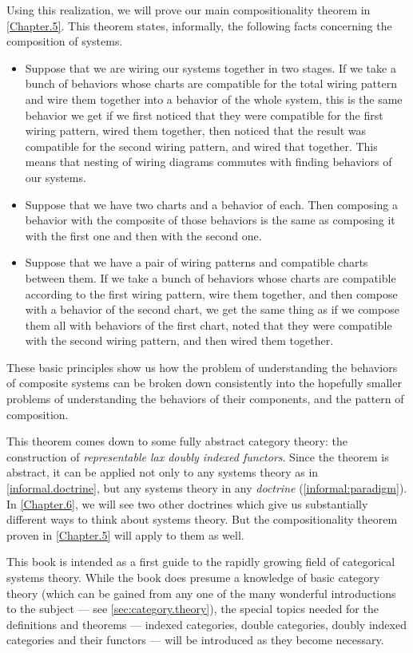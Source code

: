\documentclass[DynamicalBook]{subfiles}
\begin{document}
Using this realization, we will prove our main compositionality theorem in \cref{Chapter.5}. This theorem states, informally, the following facts concerning the composition of systems.
\begin{itemize}
  \item Suppose that we are wiring
    our systems together in two stages. If we take a
    bunch of behaviors whose charts are compatible for the total wiring pattern
    and wire them together into a behavior of the whole system, this is the same
    behavior we get if we first noticed that they were compatible for the first
    wiring pattern, wired them together, then noticed that the result was
    compatible for the second wiring pattern, and wired that together. This
    means that nesting of wiring diagrams commutes with finding behaviors of our systems.
  \item Suppose that we have two
    charts and a behavior of each. Then composing a behavior with the composite of those behaviors is the same as composing
    it with the first one and then with the second one.
  \item Suppose that we have a pair of
    wiring patterns and compatible charts between them. If we
    take a bunch of behaviors whose charts are compatible according to the first
    wiring pattern, wire them together, and then compose with a behavior of the
    second chart, we get the same thing as if we compose them all with behaviors
    of the first chart, noted that they were compatible with the second wiring
    pattern, and then wired them together.
\end{itemize}

These basic principles show us how the problem of understanding the behaviors of composite systems can be broken down consistently into the hopefully smaller problems of understanding the behaviors of their components, and the pattern of composition.

This theorem comes down to some fully abstract category theory: the construction of \emph{representable lax doubly indexed functors}. Since the theorem is abstract, it can be applied not only to any systems theory as in \cref{informal.doctrine}, but any systems theory in any \emph{doctrine} (\cref{informal:paradigm}). In \cref{Chapter.6}, we will see two other doctrines which give us substantially different ways to think about systems theory. But the compositionality theorem proven in \cref{Chapter.5} will apply to them as well.

This book is intended as a first guide to the rapidly growing field of categorical systems theory. While the book does presume a knowledge of basic category theory (which can be gained from any one of the many wonderful introductions to the subject --- see \cref{sec:category.theory}), the special topics needed for the definitions and theorems --- indexed categories, double categories, doubly indexed categories and their functors --- will be introduced as they become necessary.
\end{document}
